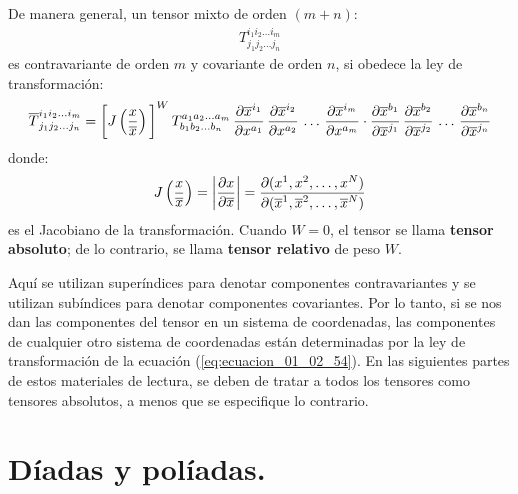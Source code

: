 \documentclass[hidelinks,12pt]{article}
\begin{document}
De manera general, un tensor mixto de orden $(m + n)$:
\begin{align}
T_{j_{1} j_{2} \ldots j_{n}}^{i_{1} i_{2} \ldots i_{m}}
\label{eq:ecuacion_01_02_53}
\end{align}
es contravariante de orden $m$ y covariante de orden $n$, si obedece la ley de transformación:
\begin{align}
\overline{T}_{j_{1} j_{2} \ldots j_{n}}^{i_{1} i_{2} \ldots i_{m}} = \bigg[ J \left( \dfrac{x}{\overline{x}} \right) \bigg]^{W} \, T_{b_{1} b_{2} \ldots b_{n}}^{a_{1} a_{2} \ldots a_{m}} \, \pdv{\overline{x}^{i_{1}}}{x^{a_{1}}} \, \pdv{\overline{x}^{i_{2}}}{x^{a_{2}}} \, \ldots \, \pdv{\overline{x}^{i_{m}}}{x^{a_{m}}} \cdot \pdv{\overline{x}^{b_{1}}}{\overline{x}^{j_{1}}} \, \pdv{\overline{x}^{b_{2}}}{\overline{x}^{j_{2}}} \, \ldots \, \pdv{\overline{x}^{b_{n}}}{\overline{x}^{j_{n}}}
\label{eq:ecuacion_01_02_54}
\end{align}
donde:
\begin{align*}
J \left( \dfrac{x}{\overline{x}} \right) = \abs{\pdv{x}{\overline{x}}} = \pdv{(x^{1}, x^{2}, \ldots, x^{N})}{(\overline{x}^{1}, \overline{x}^{2}, \ldots, \overline{x}^{N})}
\end{align*}
es el Jacobiano de la transformación. Cuando $W = 0$, el tensor se llama \textbf{tensor absoluto}; de lo contrario, se llama \textbf{tensor relativo} de peso $W$.
\par
Aquí se utilizan superíndices para denotar componentes contravariantes y se utilizan subíndices para denotar componentes covariantes. Por lo tanto, si se nos dan las componentes del tensor en un sistema de coordenadas, las componentes de cualquier otro sistema de coordenadas están determinadas por la ley de transformación de la ecuación (\ref{eq:ecuacion_01_02_54}). En las siguientes partes de estos materiales de lectura, se deben de tratar a todos los tensores como tensores absolutos, a menos que se especifique lo contrario.

\section{Díadas y políadas.}
\end{document}
